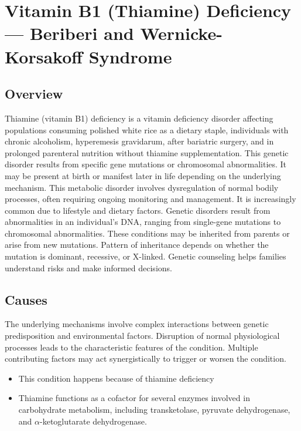 \chapter{Vitamin B1 (Thiamine) Deficiency --- Beriberi and Wernicke-Korsakoff Syndrome}
\label{sec:Vitamin B1 Deficiency}

\section{Overview}
Thiamine (vitamin B1) deficiency is a vitamin deficiency disorder affecting populations consuming polished white rice as a dietary staple, individuals with chronic alcoholism, hyperemesis gravidarum, after bariatric surgery, and in prolonged parenteral nutrition without thiamine supplementation. This genetic disorder results from specific gene mutations or chromosomal abnormalities. It may be present at birth or manifest later in life depending on the underlying mechanism. This metabolic disorder involves dysregulation of normal bodily processes, often requiring ongoing monitoring and management. It is increasingly common due to lifestyle and dietary factors. Genetic disorders result from abnormalities in an individual's DNA, ranging from single-gene mutations to chromosomal abnormalities. These conditions may be inherited from parents or arise from new mutations. Pattern of inheritance depends on whether the mutation is dominant, recessive, or X-linked. Genetic counseling helps families understand risks and make informed decisions.
\section{Causes}
The underlying mechanisms involve complex interactions between genetic predisposition and environmental factors. Disruption of normal physiological processes leads to the characteristic features of the condition. Multiple contributing factors may act synergistically to trigger or worsen the condition.

\begin{itemize}[noitemsep]
  \item This condition happens because of thiamine deficiency
  \item Thiamine functions as a cofactor for several enzymes involved in carbohydrate metabolism, including transketolase, pyruvate dehydrogenase, and $\alpha$-ketoglutarate dehydrogenase.
\end{itemize}
